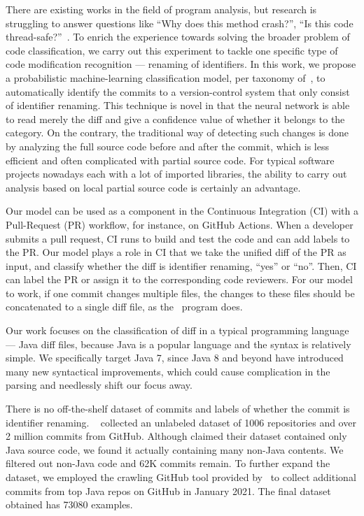 There are existing works in the field of program analysis,
but research is struggling to answer questions like ``Why does this method crash?'', ``Is this code thread-safe?''~\cite{alexandru2017replicating}.
To enrich the experience towards solving the broader problem of code classification,
we carry out this experiment to tackle one specific type of code modification recognition
--- renaming of identifiers.
In this work, we propose a probabilistic machine-learning classification model,
per taxonomy of~\cite{allamanis2018survey},
to automatically identify the commits to a version-control system that only consist of identifier renaming.
This technique is novel in that the neural network is able to read merely the diff and give a confidence value of whether it belongs to the category.
On the contrary, the traditional way of detecting such changes is done by analyzing the full source code before and after the commit,
which is less efficient and often complicated with partial source code.
For typical software projects nowadays each with a lot of imported libraries,
the ability to carry out analysis based on local partial source code is certainly an advantage.

Our model can be used as a component in the Continuous Integration (CI) with a Pull-Request (PR) workflow, for instance, on GitHub Actions.
When a developer submits a pull request, CI runs to build and test the code and can add labels to the PR.
Our model plays a role in CI that we take the unified diff of the PR as input,
and classify whether the diff is identifier renaming, ``yes'' or ``no''.
Then, CI can label the PR or assign it to the corresponding code reviewers.
For our model to work, if one commit changes multiple files,
the changes to these files should be concatenated to a single diff file,
as the~{\gitdiff} program does.

Our work focuses on the classification of diff in a typical programming language
--- Java diff files,
because Java is a popular language and the syntax is relatively simple.
We specifically target Java 7, since Java 8 and beyond have introduced many new syntactical improvements,
which could cause complication in the parsing and needlessly shift our focus away.

There is no off-the-shelf dataset of commits and labels of whether the commit is identifier renaming.
~\cite{jiang2017} collected an unlabeled dataset of \num{1006} repositories and over 2 million commits from GitHub.
Although  claimed their dataset contained only Java source code,
we found it actually containing many non-Java contents.
We filtered out non-Java code and 62K commits remain.
To further expand the dataset, we employed the crawling GitHub tool provided by~\cite{alexandru2017replicating} to collect additional commits from top Java repos on GitHub in January 2021.
The final dataset obtained has \num{73080} examples.

